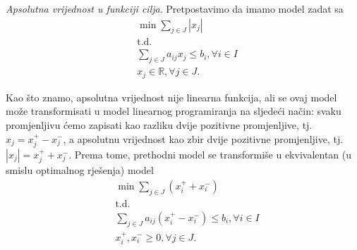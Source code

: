 \documentclass[b5paper, utf8, 11pt, colorlinks]{book}
\theoremstyle{definition}
\begin{document}
\emph{Apsolutna vrijednost u funkciji cilja}.   Pretpostavimo da imamo model zadat sa 
\begin{align}
	&\min \sum_{j \in J}   |x_j| \nonumber \\
	& \mbox{t.d.} \nonumber \\
	& \sum_{j\in J} a_{ij} x_j \leq b_i, \forall i\in I  \nonumber \\
	& x_j \in \mathbb{R}, \forall j \in J. \label{eq:lp_abs}
\end{align} 
 
Kao što znamo, apsolutna vrijednost nije linearna funkcija, ali se ovaj model može transformisati u model linearnog programiranja na sljedeći način: 
svaku   promjenljivu ćemo zapisati kao razliku dvije pozitivne promjenljive, tj.  $x_j = x_j^+ - x_j^-$, a apsolutnu vrijednost kao zbir dvije pozitivne promjenljive, tj. $|x_j|= x_j^+ + x_j^-$. Prema tome, prethodni model se transformiše  u ekvivalentan (u smislu optimalnog rješenja) model  
\begin{align}
	&\min \sum_{j \in J}  (x_i^+ + x_i^-) \nonumber \\
	& \mbox{t.d.} \nonumber \\
	&\sum_{j\in J} a_{ij} (  x_i^+ - x_i^- ) \leq b_i, \forall i \in I \nonumber \\
	&  x_i^+, x_i^- \geq 0, \forall j\in J. \label{eq:lp_abs_transformed}
\end{align}
 
\end{document}
